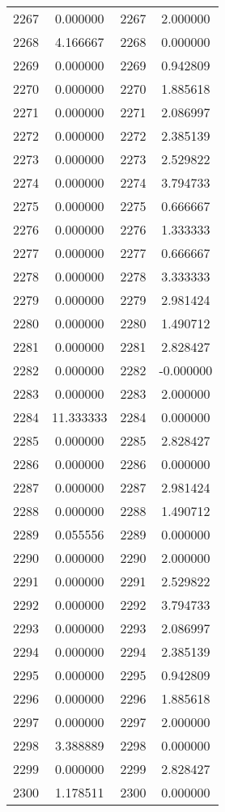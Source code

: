 \documentclass[12pt]{article}
\begin{document}
\begin{longtable}{@{}cccc@{}}
2267 & 0.000000 & 2267 & 2.000000 \\
2268 & 4.166667 & 2268 & 0.000000 \\
2269 & 0.000000 & 2269 & 0.942809 \\
2270 & 0.000000 & 2270 & 1.885618 \\
2271 & 0.000000 & 2271 & 2.086997 \\
2272 & 0.000000 & 2272 & 2.385139 \\
2273 & 0.000000 & 2273 & 2.529822 \\
2274 & 0.000000 & 2274 & 3.794733 \\
2275 & 0.000000 & 2275 & 0.666667 \\
2276 & 0.000000 & 2276 & 1.333333 \\
2277 & 0.000000 & 2277 & 0.666667 \\
2278 & 0.000000 & 2278 & 3.333333 \\
2279 & 0.000000 & 2279 & 2.981424 \\
2280 & 0.000000 & 2280 & 1.490712 \\
2281 & 0.000000 & 2281 & 2.828427 \\
2282 & 0.000000 & 2282 & -0.000000 \\
2283 & 0.000000 & 2283 & 2.000000 \\
2284 & 11.333333 & 2284 & 0.000000 \\
2285 & 0.000000 & 2285 & 2.828427 \\
2286 & 0.000000 & 2286 & 0.000000 \\
2287 & 0.000000 & 2287 & 2.981424 \\
2288 & 0.000000 & 2288 & 1.490712 \\
2289 & 0.055556 & 2289 & 0.000000 \\
2290 & 0.000000 & 2290 & 2.000000 \\
2291 & 0.000000 & 2291 & 2.529822 \\
2292 & 0.000000 & 2292 & 3.794733 \\
2293 & 0.000000 & 2293 & 2.086997 \\
2294 & 0.000000 & 2294 & 2.385139 \\
2295 & 0.000000 & 2295 & 0.942809 \\
2296 & 0.000000 & 2296 & 1.885618 \\
2297 & 0.000000 & 2297 & 2.000000 \\
2298 & 3.388889 & 2298 & 0.000000 \\
2299 & 0.000000 & 2299 & 2.828427 \\
2300 & 1.178511 & 2300 & 0.000000 \\

\end{longtable}
\end{document}

